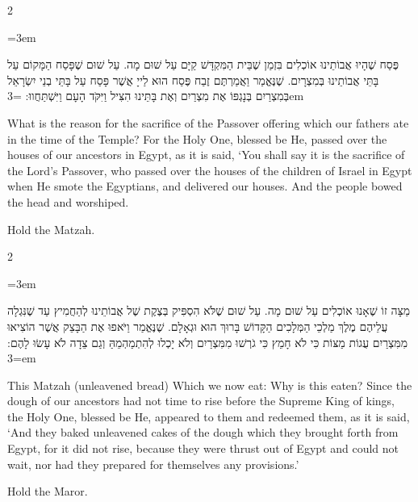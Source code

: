 \documentclass[11pt, openany]{book}
\newcommand{\instruction}[1]{%
  \par\vspace{3pt}
  \begin{tcolorbox}[
    enhanced,
    breakable,
    colback=sederlight,
    colframe=sedergold!40,
    boxrule=1pt,
    left=10pt,
    right=6pt,
    top=4pt,
    bottom=4pt,
    borderline west={3pt}{0pt}{sederwine!60},
    arc=6pt,
    outer arc=6pt,
  ]
    {\kidsinstructionfont\small\textcolor{sederwine}{#1}}
  \end{tcolorbox}
  \par\vspace{2pt}
}
\newenvironment{bilingual}{%
  \par\vspace{4pt}%
  \begin{paracol}{2}%
}{%
  \end{paracol}%
  \par\vspace{2pt}%
}
\newenvironment{hebrewcol}{%
  \switchcolumn[1]%
  \begingroup
  \RTL
  \hebrewfont\large
  \setstretch{1.4}%
  \emergencystretch=3em
  \tolerance=9999
  \parindent=0pt\relax
}{%
  \endRTL
  \endgroup
}
\newenvironment{englishcol}{%
  \switchcolumn[0]%
  \begingroup
  \setstretch{1.4}%
  \emergencystretch=3em
  \tolerance=9999
  \normalsize
  \rightskip=0.12in\relax
}{%
  \endgroup
}
\begin{document}
\begin{bilingual}
\begin{hebrewcol}
פֶּסַח שֶׁהָיוּ אֲבוֹתֵינוּ אוֹכְלִים בִּזְמַן שֶׁבֵּית הַמִּקְדָּשׁ קַיָּם עַל שׁוּם מָה. עַל שׁוּם שֶׁפָּסַח הַמָּקוֹם עַל בָּתֵּי אֲבוֹתֵינוּ בְּמִצְרָיִם. שֶׁנֶּאֱמַר וַאֲמַרְתֶּם זֶבַח פֶּסַח הוּא לַייָ אֲשֶׁר פָּסַח עַל בָּתֵּי בְנֵי יִשְׂרָאֵל בְּמִצְרַיִם בְּנָגְפּוֹ אֶת מִצְרַיִם וְאֶת בָּתֵּינוּ הִצִּיל וַיִּקֹּד הָעָם וַיִּשְׁתַּחֲווּ:
\end{hebrewcol}
\begin{englishcol}
What is the reason for the sacrifice of the Passover offering which our fathers ate in the time of the Temple? For the Holy One, blessed be He, passed over the houses of our ancestors in Egypt, as it is said, `You shall say it is the sacrifice of the Lord's Passover, who passed over the houses of the children of Israel in Egypt when He smote the Egyptians, and delivered our houses. And the people bowed the head and worshiped.
\end{englishcol}
\end{bilingual}
\instruction{Hold the Matzah.}

\begin{bilingual}
\begin{hebrewcol}
מַצָּה זוֹ שֶׁאָנוּ אוֹכְלִים עַל שׁוּם מָה. עַל שׁוּם שֶׁלֹּא הִסְפִּיק בְּצֶקֶת שֶׁל אֲבוֹתֵינוּ לְהַחֲמִיץ עַד שֶׁנִּגְלָה עֲלֵיהֶם מֶלֶךְ מַלְכֵי הַמְּלָכִים הַקָּדוֹשׁ בָּרוּךְ הוּא וּגְאָלָם. שֶׁנֶּאֱמַר וַיֹּאפוּ אֶת הַבָּצֵק אֲשֶׁר הוֹצִיאוּ מִמִּצְרַיִם עֻגוֹת מַצּוֹת כִּי לֹא חָמֵץ כִּי גֹרְשׁוּ מִמִּצְרַיִם וְלֹא יָכְלוּ לְהִתְמַהְמֵהַּ וְגַם צֵדָה לֹא עָשׂוּ לָהֶם:
\end{hebrewcol}
\begin{englishcol}
This Matzah (unleavened bread) Which we now eat: Why is this eaten? Since the dough of our ancestors had not time to rise before the Supreme King of kings, the Holy One, blessed be He, appeared to them and redeemed them, as it is said, `And they baked unleavened cakes of the dough which they brought forth from Egypt, for it did not rise, because they were thrust out of Egypt and could not wait, nor had they prepared for themselves any provisions.'
\end{englishcol}
\end{bilingual}
\instruction{Hold the Maror.}
\end{document}

